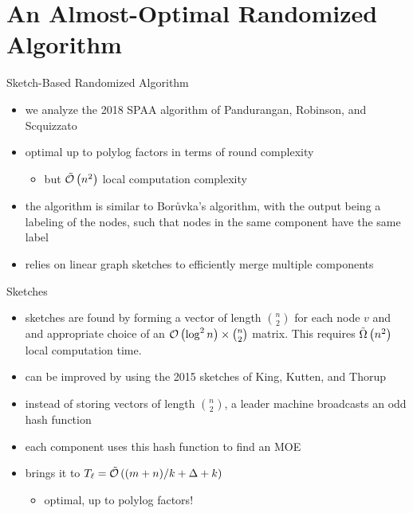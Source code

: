 \section{An Almost-Optimal Randomized Algorithm}
\begin{frame}{Sketch-Based Randomized Algorithm}
    \begin{itemize}
        \item we analyze the 2018 SPAA algorithm of Pandurangan, Robinson, and Scquizzato
        \item optimal up to polylog factors in terms of round complexity
        \begin{itemize}
            \item but $\tilde{\mathcal{O}}\left(n^2\right)$ local computation complexity
        \end{itemize}
        \item the algorithm is similar to Bor\r{u}vka's algorithm, with
              the output being a \alert{labeling} of the nodes, such that nodes in the same component have the same label
        \item relies on \alert{linear graph sketches} to efficiently merge multiple components
    \end{itemize}
\end{frame}

\begin{frame}{Sketches}
    \begin{itemize}
        \item sketches are found by forming a vector of length
              $\binom{n}{2}$ for each node $v$ and and appropriate choice of an
              $\mathcal{O}\left(\log^2{n}\right) \times \binom{n}{2}$ matrix. This requires $\tilde{\Omega}\left(n^2\right)$ local computation time.
        \item can be improved by using the 2015 sketches of King, Kutten, and Thorup
        \item instead of storing vectors of length $\binom{n}{2}$, a leader machine broadcasts an \alert{odd hash function}
        \item each component uses this hash function to find an MOE
        \item brings it to $T_{\ell} = \tilde{\mathcal{O}}\left((m+n) / k + \Delta + k\right)$
        \begin{itemize}
            \item optimal, up to polylog factors!
        \end{itemize}
    \end{itemize}
\end{frame}

